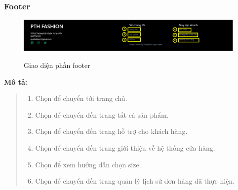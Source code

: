 \subsubsection{Footer}
\begin{figure}[!htp]
    \centering
    \includegraphics[width=5in]{img/UI/new_customer/footer.png}
    \label{7}
    \newline
    \caption{Giao diện phần footer}
\end{figure}
\textbf{Mô tả:}
\begin{quote}
    \begin{enumerate}
        \item Chọn để chuyển tới trang chủ.
        \item Chọn để chuyển đến trang tất cả sản phẩm.
        \item Chọn để chuyển đến trang hỗ trợ cho khách hàng.
        \item Chọn để chuyển đến trang giới thiệu về hệ thống cửa hàng.
        \item Chọn để xem hướng dẫn chọn size.
        \item Chọn để chuyển đến trang quản lý lịch sử đơn hàng đã thực hiện.
    \end{enumerate}
\end{quote}

\newpage
